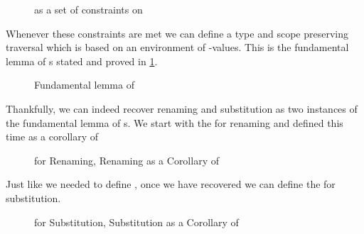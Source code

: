 \begin{figure}[h]
\caption{ as a set of constraints on }
\end{figure}

Whenever these constraints are met we can define a type and scope
preserving traversal which is based on an environment of -values.
This is the fundamental lemma of s stated and proved in \cref{fig:kitlemma}.

\begin{figure}[h]
\caption{Fundamental lemma of \label{fig:kitlemma}}
\end{figure}

Thankfully, we can indeed recover renaming and substitution as two instances of
the fundamental lemma of s. We start with the  for renaming
and  defined this time as a corollary of 

\begin{figure}[h]
\begin{minipage}[t]{0.4\textwidth}
\end{minipage}
\begin{minipage}[t]{0.6\textwidth}
\end{minipage}
\caption{ for Renaming, Renaming as a Corollary of \label{fig:renkit}}
\end{figure}

Just like we needed  to define , once we have recovered 
we can define the  for substitution.

\begin{figure}[h]
\begin{minipage}[t]{0.4\textwidth}
\end{minipage}
\begin{minipage}[t]{0.6\textwidth}
\end{minipage}
\caption{ for Substitution, Substitution as a Corollary of \label{fig:subkit}}
\end{figure}

